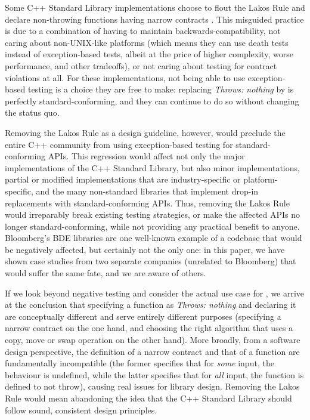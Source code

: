 Some C++ Standard Library implementations choose to flout the Lakos Rule and declare non-throwing functions having narrow contracts . This misguided practice is due to a combination of having to maintain backwards-compatibility, not caring about non-UNIX-like platforms (which means they can use death tests instead of exception-based tests, albeit at the price of higher complexity, worse performance, and other tradeoffs), or not caring about testing for contract violations at all. For these implementations, not being able to use exception-based testing is a choice they are free to make: replacing \emph{Throws: nothing} by  is perfectly standard-conforming, and they can continue to do so without changing the status quo.

Removing the Lakos Rule as a design guideline, however, would preclude the entire C++ community from using exception-based testing for standard-conforming APIs. This regression would affect not only the major implementations of the C++ Standard Library, but also minor implementations, partial or modified implementations that are industry-specific or platform-specific, and the many non-standard libraries that implement drop-in replacements with standard-conforming APIs. Thus, removing the Lakos Rule would irreparably break existing testing strategies, or make the affected APIs no longer standard-conforming, while not providing any practical benefit to anyone. Bloomberg's BDE libraries are one well-known example of a codebase that would be negatively affected, but certainly not the only one: in this paper, we have shown case studies from two separate companies (unrelated to Bloomberg) that would suffer the same fate, and we are aware of others.

If we look beyond negative testing and consider the actual use case for , we arrive at the conclusion that specifying a function as \emph{Throws: nothing} and declaring it  are conceptually different and serve entirely different purposes (specifying a narrow contract on the one hand, and choosing the right algorithm that uses a copy, move or swap operation on the other hand). More broadly, from a software design perspective, the definition of a narrow contract and that of a  function are fundamentally incompatible (the former specifies that for \emph{some} input, the behaviour is undefined, while the latter specifies that for \emph{all} input, the function is defined to not throw), causing real issues for library design. Removing the Lakos Rule would mean abandoning the idea that the C++ Standard Library should follow sound, consistent design principles.

